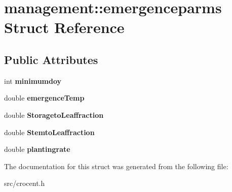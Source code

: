 \hypertarget{structmanagement_1_1emergenceparms}{\section{management\-:\-:emergenceparms Struct Reference}
\label{structmanagement_1_1emergenceparms}
}
\subsection*{Public Attributes}
\begin{DoxyCompactItemize}
\item 
\hypertarget{structmanagement_1_1emergenceparms_a08b46e1284eaa200bae6dca9d58734a9}{int {\bfseries minimumdoy}}\label{structmanagement_1_1emergenceparms_a08b46e1284eaa200bae6dca9d58734a9}

\item 
\hypertarget{structmanagement_1_1emergenceparms_aa0ea2782e9d6f32d626e067068bdb51a}{double {\bfseries emergence\-Temp}}\label{structmanagement_1_1emergenceparms_aa0ea2782e9d6f32d626e067068bdb51a}

\item 
\hypertarget{structmanagement_1_1emergenceparms_a10faab15cb48f54065f0fce8767f8828}{double {\bfseries Storageto\-Leaffraction}}\label{structmanagement_1_1emergenceparms_a10faab15cb48f54065f0fce8767f8828}

\item 
\hypertarget{structmanagement_1_1emergenceparms_aa3904dd0545c524c89af0d35812da44d}{double {\bfseries Stemto\-Leaffraction}}\label{structmanagement_1_1emergenceparms_aa3904dd0545c524c89af0d35812da44d}

\item 
\hypertarget{structmanagement_1_1emergenceparms_aa3f66e7cdc6b76dfdad960c1d9d4a583}{double {\bfseries plantingrate}}\label{structmanagement_1_1emergenceparms_aa3f66e7cdc6b76dfdad960c1d9d4a583}

\end{DoxyCompactItemize}


The documentation for this struct was generated from the following file\-:\begin{DoxyCompactItemize}
\item 
src/crocent.\-h\end{DoxyCompactItemize}
